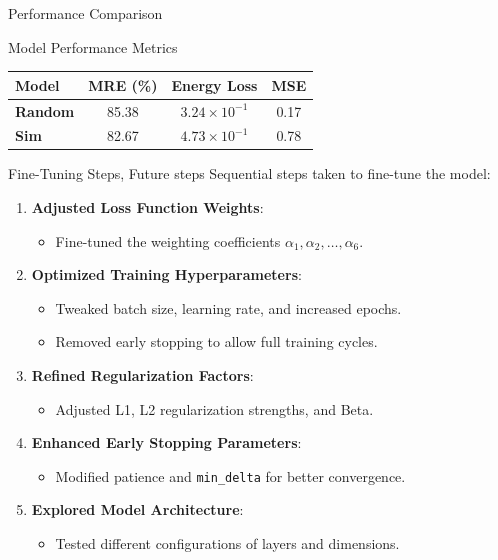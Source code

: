 \documentclass[9pt]{beamer}
\begin{document}
\begin{frame}{Performance Comparison}
  \begin{block}{Model Performance Metrics}
  \begin{center}
  \begin{tabular}{lccc}
  \toprule
  \textbf{Model} & \textbf{MRE (\%)} & \textbf{Energy Loss} & \textbf{MSE} \\
  \midrule
  \textbf{Random}        & 85.38 & $3.24 \times 10^{-1}$ & 0.17 \\
  \textbf{Sim}           & 82.67 & $4.73 \times 10^{-1}$ & 0.78  \\
  \bottomrule
  \end{tabular}
  \end{center}
  \end{block}
\end{frame}

\begin{frame}{Fine-Tuning Steps, Future steps}
  Sequential steps taken to fine-tune the model:
  \begin{enumerate}
    \item \textbf{Adjusted Loss Function Weights}:
    \begin{itemize}
      \item Fine-tuned the weighting coefficients \( \alpha_1, \alpha_2, \dots, \alpha_6 \).
    \end{itemize}
    \item \textbf{Optimized Training Hyperparameters}:
    \begin{itemize}
      \item Tweaked batch size, learning rate, and increased epochs.
      \item Removed early stopping to allow full training cycles.
    \end{itemize}
    \item \textbf{Refined Regularization Factors}:
    \begin{itemize}
      \item Adjusted L1, L2 regularization strengths, and Beta.
    \end{itemize}
    \item \textbf{Enhanced Early Stopping Parameters}:
    \begin{itemize}
      \item Modified patience and \texttt{min\_delta} for better convergence.
    \end{itemize}
    \item \textbf{Explored Model Architecture}:
    \begin{itemize}
      \item Tested different configurations of layers and dimensions.
    \end{itemize}
  \end{enumerate}
\end{frame}
\end{document}
